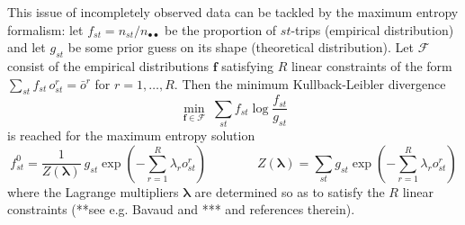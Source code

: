 \documentclass{llncs}
\begin{document}
This issue of incompletely observed data can be tackled by the maximum entropy formalism: let $f_{st}=n_{st}/n_{\bullet\bullet}$ be the proportion of $st$-trips (empirical distribution) and let $g_{st}$ be some prior guess on its shape (theoretical distribution). Let $\mathcal{F}$ consist of the empirical distributions $\mathbf{f}$ satisfying $R$ linear constraints of the form $\sum_{st}f_{st}\, o^r_{st}=\bar{o}^r$ for $r=1,\ldots, R$. Then the minimum Kullback-Leibler divergence 
\begin{displaymath}
\min_{\mathbf{f}\in\mathcal{F}}\;  \sum_{st}f_{st}\log \frac{f_{st}}{g_{st}}
\end{displaymath}
is reached for the maximum entropy solution  
\begin{equation}
\label{MaxEnt}
f^0_{st}=\frac{1}{Z(\bm{\lambda})}\: g_{st}\exp(-\sum_{r=1}^R \lambda_r o^r_{st})\qquad\qquad Z(\bm{\lambda})=\sum_{st}g_{st}\exp(-\sum_{r=1}^R \lambda_r o^r_{st})
\end{equation}
where the Lagrange multipliers $\bm{\lambda}$ are determined  so as to satisfy the $R$ linear constraints (**see e.g. Bavaud and *** and references therein). 
\end{document}
